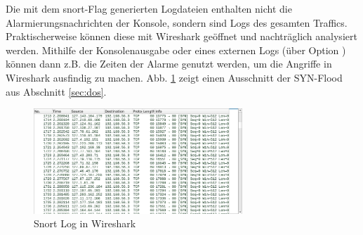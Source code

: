 Die mit dem snort-Flag  generierten Logdateien enthalten nicht die Alarmierungsnachrichten der Konsole, sondern sind Logs des gesamten Traffics. Praktischerweise können diese mit Wireshark geöffnet und nachträglich analysiert werden. Mithilfe der Konsolenausgabe oder eines externen Logs (über Option ) können dann z.B. die Zeiten der Alarme genutzt werden, um die Angriffe in Wireshark ausfindig zu machen. Abb. \ref{fig:wireshark} zeigt einen Ausschnitt der SYN-Flood aus Abschnitt \ref{sec:dos}.

\begin{figure}[H]
\centering
\includegraphics[width=0.7\textwidth]{graphics/attacks/wireshark.png}
\caption{Snort Log in Wireshark}\label{fig:wireshark}
\end{figure}
